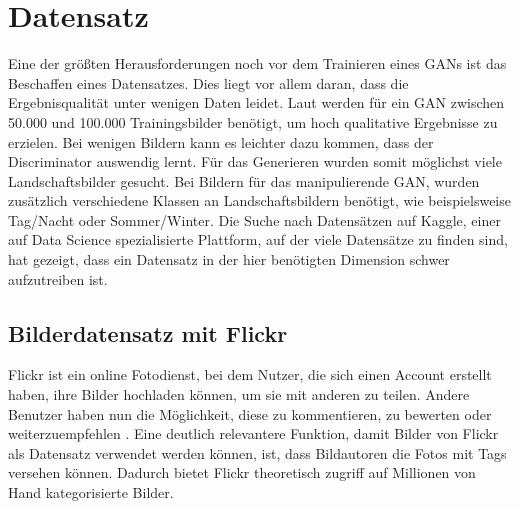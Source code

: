 \chapter{Datensatz}\label{chp:datensatz} %
\glsresetall
Eine der größten Herausforderungen noch vor dem Trainieren eines GANs ist das
Beschaffen eines Datensatzes.  Dies liegt vor allem daran, dass die
Ergebnisqualität unter wenigen Daten leidet. Laut
 \cite{noauthor_nvidia_2020} werden für ein GAN
zwischen 50.000 und 100.000 Trainingsbilder benötigt, um hoch qualitative
Ergebnisse zu erzielen. Bei wenigen Bildern kann es leichter dazu kommen, dass
der Discriminator auswendig lernt. Für das Generieren wurden somit möglichst
viele Landschaftsbilder gesucht. Bei Bildern für das manipulierende GAN, wurden
zusätzlich verschiedene Klassen an Landschaftsbildern  benötigt, wie
beispielsweise Tag/Nacht oder Sommer/Winter. Die Suche nach Datensätzen auf
Kaggle, einer auf Data Science spezialisierte Plattform, auf der viele
Datensätze zu finden sind, hat gezeigt, dass ein Datensatz in der hier
benötigten Dimension schwer aufzutreiben ist.

\section{Bilderdatensatz mit Flickr}\label{flickr} %
Flickr ist ein online Fotodienst, bei dem Nutzer, die sich einen Account
erstellt haben, ihre Bilder hochladen können, um sie mit anderen zu teilen.
Andere Benutzer haben nun die Möglichkeit, diese zu kommentieren, zu bewerten
oder weiterzuempfehlen \cite{noauthor_was_nodate}. Eine deutlich relevantere
Funktion, damit Bilder von Flickr als Datensatz verwendet werden können, ist,
dass Bildautoren die Fotos mit Tags versehen können. Dadurch bietet Flickr
theoretisch zugriff auf Millionen von Hand kategorisierte Bilder. 

